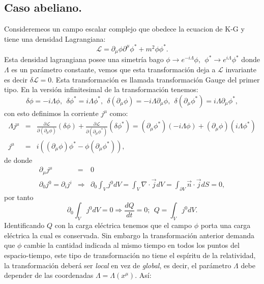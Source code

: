 \subsection{Caso abeliano.}
Consideremeos un campo escalar complejo que obedece la ecuacion de K-G y tiene una densidad Lagrangiana:
\begin{equation}
\mathcal{L}=\partial_{\mu}\phi\partial^{\mu}\phi^{*}+m^{2}\phi\phi^{*}.
\end{equation}
Esta densidad lagrangiana posee una simetría bago $\phi\to e^{-i\Lambda}\phi,\ \ \phi^{*}\to e^{i\Lambda}\phi^{*}$ donde $\Lambda$ es un parámetro constante, vemos que esta transformación deja a $\mathcal{L}$ invariante es decir $\delta\mathcal{L}=0$. Esta transformación es llamada transformación Gauge del primer tipo. En la versión infinitesimal de la transformación tenemos:
\begin{equation}
\delta\phi=-i\Lambda\phi,\ \ \delta\phi^{*}=i\Lambda\phi^{*},\ \ \delta(\partial_{\mu}\phi)=-i\Lambda\partial_{\mu}\phi,\ \ \delta(\partial_{\mu}\phi^{*})=i\Lambda\partial_{\mu}\phi^{*},
\end{equation}
con esto definimos la corriente $j^{\mu}$ como:
\begin{eqnarray}
\nonumber \Lambda j^{\mu}&=&\frac{\partial\mathcal{L}}{\partial(\partial_{\mu}\phi)}(\delta\phi)+\frac{\partial\mathcal{L}}{\partial(\partial_{\mu}\phi^{*})}(\delta\phi^{*})=(\partial_{\mu}\phi^{*})(-i\Lambda\phi)+(\partial_{\mu}\phi)(i\Lambda\phi^{*})\\
j^\mu &=& i((\partial_{\mu}\phi)\phi^{*}-\phi(\partial_{\mu}\phi^{*})),
\end{eqnarray}
de donde
\begin{eqnarray}
\partial_\mu j^\mu &=& 0\\
\partial_{0}j^{0}=\partial_{i}j^{i}&\Rightarrow &\partial_{0}\int_{V}j^{0}dV=\int_{V}\nabla\cdot\vec{j}dV=\int_{\partial V}\vec{n}\cdot\vec{j}dS=0,
\end{eqnarray} 
por tanto
\begin{equation}
\partial_{0}\int_{V}j^{0}dV=0\Rightarrow\frac{dQ}{dt}=0;\ \ Q=\int_{V}j^{0}dV.
\end{equation}
Identificando $Q$ con la carga eléctrica tenemos que el campo $\phi$ porta una carga eléctrica la cual es conservada. Sin embargo la transformación anterior demanda que $\phi$ cambie la cantidad indicada al mismo tiempo en todos los puntos del espacio-tiempo, este tipo de transformación no tiene el espíritu de la relatividad, la transformación deberá ser \textit{local} en vez de \textit{global}, es decir, el parámetro $\Lambda$ debe depender de las coordenadas $\Lambda=\Lambda(x^\mu)$. Así:
